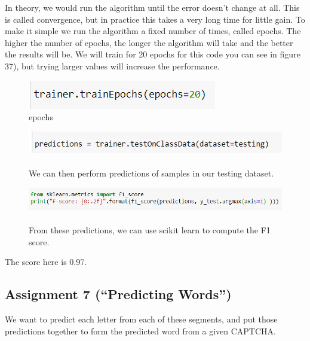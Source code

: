 \documentclass[onecolumn]{article}
\begin{document}
\begin{t}
In theory, we would run the algorithm until the error doesn't change at all. This is called convergence, but in practice this takes a very long time for little gain.
To make it simple we run the algorithm a fixed number of times, called epochs. The higher the number of epochs, the longer the algorithm will take and the better the results will be. We will train for 20 epochs for this code you can see in figure 37), but trying larger values will increase the performance.
\end{t}

\begin{figure}[h]  
    \centering
    \includegraphics[width=.5\linewidth]{37..png}
\caption{\label{fig:demo-bad}
\centering
epochs\\}
\end{figure}

\newpage
\begin{figure}[h]
    \centering
    \includegraphics[width=.7\linewidth]{38..png}
\caption{\label{fig:demo-bad}
\centering
\\We can then perform predictions of samples in our testing dataset.}
\end{figure}

\begin{figure}[h]
    \centering
    \includegraphics[width=.8\linewidth]{39..png}
\caption{\label{fig:demo-bad}
\centering
\\From these predictions, we can use scikit learn to compute the F1 score.}
\end{figure}

\begin{t}
The score here is 0.97.
\end{t}

\subsection{Assignment 7 (``Predicting Words'')}

\begin{t}
We want to predict each letter from each of these segments, and put those
predictions together to form the predicted word from a given CAPTCHA.
\end{t}
\end{document}
